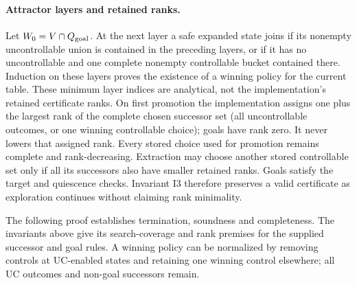\paragraph{Attractor layers and retained ranks.}\label{ta:retained-ranks}
Let $W_0=V\cap Q_{\mathrm{goal}}$. At the next layer a safe expanded state joins if its nonempty uncontrollable union is contained in the preceding layers, or if it has no uncontrollable and one complete nonempty controllable bucket contained there. Induction on these layers proves the existence of a winning policy for the current table. These minimum layer indices are analytical, not the implementation's retained certificate ranks. On first promotion the implementation assigns one plus the largest rank of the complete chosen successor set (all uncontrollable outcomes, or one winning controllable choice); goals have rank zero. It never lowers that assigned rank. Every stored choice used for promotion remains complete and rank-decreasing. Extraction may choose another stored controllable set only if all its successors also have smaller retained ranks. Goals satisfy the target and quiescence checks. Invariant I3 therefore preserves a valid certificate as exploration continues without claiming rank minimality.

The following proof establishes termination, soundness and completeness. The invariants above give its search-coverage and rank premises for the supplied successor and goal rules. A winning policy can be normalized by removing controls at UC-enabled states and retaining one winning control elsewhere; all UC outcomes and non-goal successors remain.

